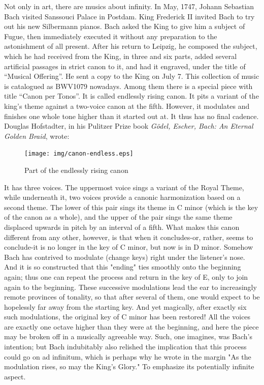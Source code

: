\documentclass{article}
\begin{document}
Not only in art, there are musics about infinity. In May, 1747, Johann Sebastian Bach visited Sanssouci Palace in Postdam. King Frederick II invited Bach to try out his new Silbermann pianos. Bach asked the King to give him a subject of Fugue, then immediately executed it without any preparation to the astonishment of all present. After his return to Leipzig, he composed the subject, which he had received from the King, in three and six parts, added several artificial passages in strict canon to it, and had it engraved, under the title of ``Musical Offering''. He sent a copy to the King on July 7. This collection of music is catalogued as BWV1079 nowadays. Among them there is a special piece with title ``Canon per Tonos''. It is called endlessly rising canon. It pits a variant of the king’s theme against a two-voice canon at the fifth. However, it modulates and finishes one whole tone higher than it started out at. It thus has no final cadence. Douglas Hofstadter, in his Pulitzer Prize book {\em Gödel, Escher, Bach: An Eternal Golden Braid}, wrote:

\begin{figure}[htbp]
 \centering
 \texttt{[image: img/canon-endless.eps]}
 \captionsetup{labelformat=empty}
 \caption{Part of the endlessly rising canon}
 \label{fig:canon-endless}
\end{figure}

It has three voices. The uppermost voice sings a variant of the Royal Theme, while underneath it, two voices provide a canonic harmonization based on a second theme. The lower of this pair sings its theme in C minor (which is the key of the canon as a whole), and the upper of the pair sings the same theme displaced upwards in pitch by an interval of a fifth. What makes this canon different from any other, however, is that when it concludes-or, rather, seems to conclude-it is no longer in the key of C minor, but now is in D minor. Somehow Bach has contrived to modulate (change keys) right under the listener's nose. And it is so constructed that this "ending" ties smoothly onto the beginning again; thus one can repeat the process and return in the key of E, only to join again to the beginning. These successive modulations lead the ear to increasingly remote provinces of tonality, so that after several of them, one would expect to be hopelessly far away from the starting key. And yet magically, after exactly six such modulations, the original key of C minor has been restored! All the voices are exactly one octave higher than they were at the beginning, and here the piece may be broken off in a musically agreeable way. Such, one imagines, was Bach's intention; but Bach indubitably
also relished the implication that this process could go on ad infinitum, which is perhaps why he wrote in the margin "As the modulation rises, so may the King's Glory." To emphasize its potentially infinite aspect\cite{GEB}.
\end{document}
